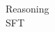 \documentclass[preview]{standalone}
\begin{document}
\begin{center}
Reasoning\\SFT
\end{center}
\end{document}
